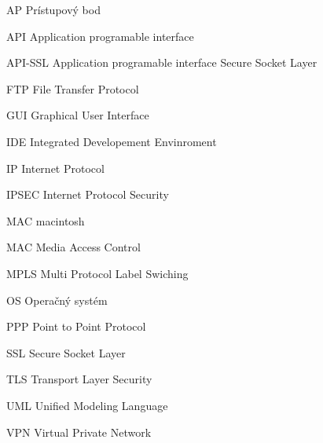 \begin{seznamzkratek}{90}
	
		{AP}								%
		{Prístupový bod}	
	
		{API}								%
		{Application programable interface}
	
	
		{API-SSL}								%
		{Application programable interface Secure Socket Layer}	
	
		{FTP}								%
		{File Transfer Protocol}		
	
		{GUI}								%
		{Graphical User Interface}	
	
		{IDE}								%
		{Integrated Developement Envinroment}		
	
		{IP}								%
		{Internet Protocol}	
	
		{IPSEC}								%
		{Internet Protocol Security}
	
		{MAC}								%
		{macintosh}
		
		{MAC}								%
		{Media Access Control}	
	
		{MPLS}								%
		{Multi Protocol Label Swiching}		
	
		{OS}								%
		{Operačný systém}		
	
		{PPP}								%
		{Point to Point Protocol}		
	
		{SSL}								%
		{Secure Socket Layer}
	
		{TLS}								%
		{Transport Layer Security}	
	
		{UML}								%
		{Unified Modeling Language}
	
		{VPN}								%
		{Virtual Private Network}	
												
\end{seznamzkratek}
